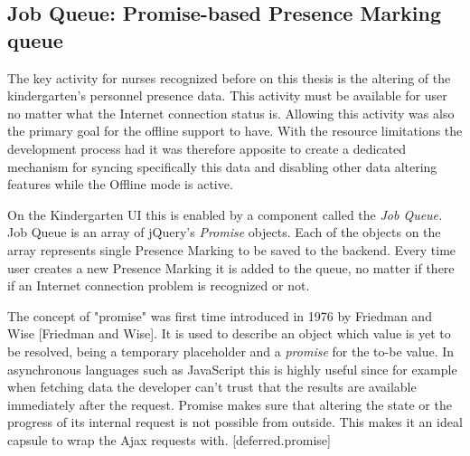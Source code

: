







\subsection{Job Queue: Promise-based Presence Marking queue}


The key activity for nurses recognized before on this thesis is the altering of the kindergarten's personnel presence data. This activity must be available for user no matter what the Internet connection status is. Allowing this activity was also the primary goal for the offline support to have. With the resource limitations the development process had it was therefore apposite to create a dedicated mechanism for syncing specifically this data and disabling other data altering features while the Offline mode is active. %

On the Kindergarten UI this is enabled by a component called the \textit{Job Queue.} Job Queue is an array of jQuery's \textit{Promise} objects. Each of the objects on the array represents single Presence Marking to be saved to the backend. Every time user creates a new Presence Marking it is added to the queue, no matter if there if an Internet connection problem is recognized or not.


The concept of "promise" was first time introduced in 1976 by Friedman and Wise [Friedman and Wise]. It is used to describe an object which value is yet to be resolved, being a temporary placeholder and a \textit{promise} for the to-be value. In asynchronous languages such as JavaScript this is highly useful since for example when fetching data the developer can't trust that the results are available immediately after the request. Promise makes sure that altering the state or the progress of its internal request is not possible from outside. This makes it an ideal capsule to wrap the Ajax requests with. [deferred.promise] %

